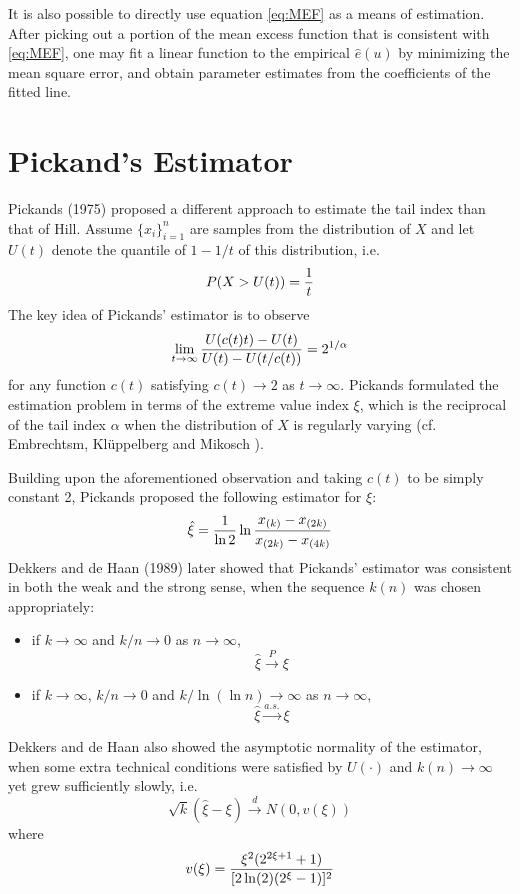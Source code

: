 \documentclass{article}
\newcommand{\1}[1]{
  \mathbf{1}_{\{#1\}}
}
\begin{document}
It is also possible to directly use equation \eqref{eq:MEF} as a means
of estimation. After picking out a portion of the mean excess function
that is consistent with \eqref{eq:MEF}, one may fit a linear function
to the empirical $\hat e(u)$ by minimizing the mean square error, and
obtain parameter estimates from the coefficients of the fitted line.
\section{Pickand's Estimator}
Pickands (1975) \cite{pickands1975statistical} proposed a different
approach to estimate the tail index than that of Hill. Assume
$\{x_i\}_{i=1}^n$ are samples from the distribution of $X$ and let $U(t)$
denote the quantile of $1 - 1/t$ of this distribution, i.e.
\[
P(X > U(t)) = {1 \over t}
\]
The key idea of Pickands' estimator is to observe
\[
\lim_{t \to \infty} {
  U(c(t) t) - U(t)
  \over
  U(t) - U(t/c(t))
} = 2^{1/\alpha}
\]
for any function $c(t)$ satisfying $c(t) \to 2$ as $t \to \infty$.
Pickands formulated the estimation problem in terms of the extreme
value index $\xi$, which is the reciprocal of the tail index $\alpha$
when the distribution of $X$ is regularly varying (cf. Embrechtsm,
Kl\"uppelberg and Mikosch \cite{Embrechts1997}).

Building upon the aforementioned observation and taking $c(t)$ to
be simply constant 2, Pickands proposed the following estimator for
$\xi$:
\[
\hat \xi = {1 \over \ln 2} \ln {
  x_{(k)} - x_{(2k)}
  \over
  x_{(2k)} - x_{(4k)}
}
\]
Dekkers and de Haan (1989) later showed \cite{dekkers1989estimation}
that Pickands' estimator was consistent in both the weak and the strong
sense, when the sequence $k(n)$ was chosen appropriately:
\begin{itemize}
\item if $k \to \infty$ and $k/n \to 0$ as $n \to \infty$,
  \[
  \hat \xi \overset{P}{\to} \xi
  \]
\item if $k \to \infty$, $k/n \to 0$ and $k / \ln(\ln n) \to \infty$
  as $n \to \infty$,
  \[
  \hat \xi \overset{a.s.}{\to} \xi
  \]
\end{itemize}
Dekkers and de Haan \cite{dekkers1989estimation} also showed the
asymptotic normality of the estimator, when some
extra technical conditions were satisfied by
$U(\cdot)$ and $k(n) \to \infty$ yet grew sufficiently slowly, i.e.
\[
\sqrt k (\hat \xi - \xi) \overset{d}{\to} N(0, v(\xi))
\]
where
\[
v(\xi) = {
  \xi^2 (2^{2 \xi + 1} + 1)
  \over
  [2 \ln(2) (2^\xi - 1)]^2
}
\]
\end{document}
